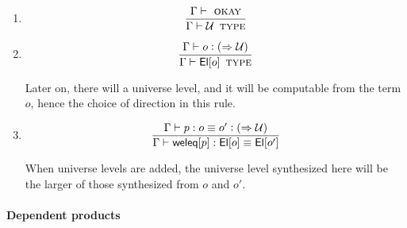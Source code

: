 \documentclass[11pt]{article}
\newcommand{\eqd}{\equiv}
\newcommand{\Eu}{{\cal U}}
\newcommand{\synth}[1]{\vcentcolon(\Rightarrow#1)} %
\newcommand{\Type}{\mathop{\text{ \sc type}}}
\newcommand{\Okay}{\mathop{\text{ \sc okay}}}
\newcommand{\ha}[2]{#1[#2]}
\newcommand{\El}{{\sf El}}
\newcommand{\weleq}{{\sf weleq}}
\begin{document}
\begin{enumerate}

\item

$$\frac{\Gamma\vdash\Okay}{\Gamma \vdash \Eu\Type}$$

\item

$$\frac{\Gamma\vdash o \synth{\Eu}}{\Gamma \vdash \ha\El{o}\Type}$$

Later on, there will a universe level, and it will be computable from the
term $o$, hence the choice of direction in this rule.

\item 

$$\frac{\Gamma\vdash p : o \eqd o' \synth{\Eu}}{\Gamma\vdash \ha\weleq{p} : \ha\El{o} \eqd \ha\El{o'}}$$

When universe levels are added, the universe level synthesized here will be the
larger of those synthesized from $o$ and $o'$.

\end{enumerate}

\paragraph{Dependent products}
\end{document}
